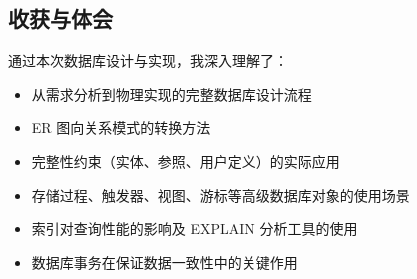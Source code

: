 \documentclass[12pt,a4paper]{ctexart}
\begin{document}
\subsection{收获与体会}

通过本次数据库设计与实现，我深入理解了：

\begin{itemize}
    \item 从需求分析到物理实现的完整数据库设计流程
    \item ER 图向关系模式的转换方法
    \item 完整性约束（实体、参照、用户定义）的实际应用
    \item 存储过程、触发器、视图、游标等高级数据库对象的使用场景
    \item 索引对查询性能的影响及 EXPLAIN 分析工具的使用
    \item 数据库事务在保证数据一致性中的关键作用
\end{itemize}
\end{document}
